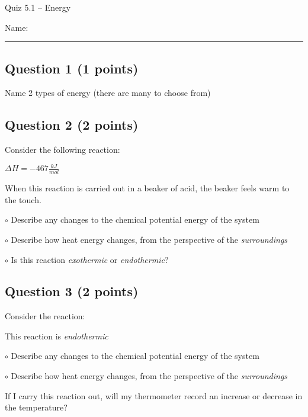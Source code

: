 \documentclass[11pt, letterpaper]{memoir}
\begin{document}
	\begin{center}
		{\large	Quiz 5.1 -- Energy}
	\end{center}
{\large Name: \rule[-1mm]{4in}{.1pt}
	
	\subsection*{Question 1 (1 points)}
	Name 2 types of energy (there are many to choose from)
	
	\vspace{8em}
	\subsection*{Question 2 (2 points)}
	Consider the following reaction:
	
	\noindent
   \hspace{2em} $\Delta H=-467\frac{kJ}{mol}$
	
  \noindent When this reaction is carried out in a beaker of acid, the beaker feels warm to the touch.

  \noindent $\circ$ Describe any changes to the chemical potential energy of the system

  \vspace{3em}

  \noindent $\circ$ Describe how heat energy changes, from the perspective of the \emph{surroundings}
	
	\vspace{3em}
	\noindent $\circ$ Is this reaction \emph{exothermic} or \emph{endothermic}?

	\subsection*{Question 3 (2 points)}
	Consider the reaction:  
	
  \noindent This reaction is \emph{endothermic}

  \noindent $\circ$ Describe any changes to the chemical potential energy of the system

  \vspace{3em}

  \noindent $\circ$ Describe how heat energy changes, from the perspective of the \emph{surroundings}
	
	\vspace{3em}
	\noindent If I carry this reaction out, will my thermometer record an increase or decrease in the temperature?

}
\end{document}
